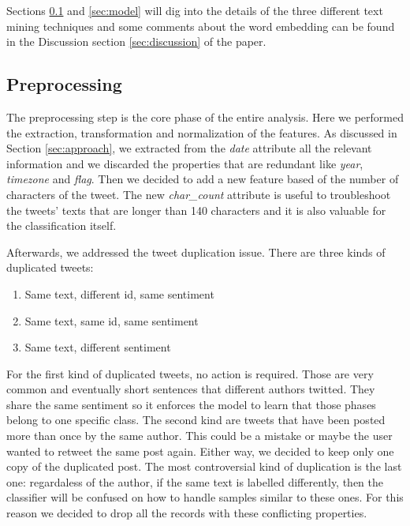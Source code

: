 \documentclass[conference]{IEEEtran}
\begin{document}
Sections \ref{sec:preprocessing} and \ref{sec:model} will dig into the details of the three different text mining techniques and some comments about the word embedding can be found in the Discussion section \ref{sec:discussion} of the paper.

\subsection{Preprocessing}\label{sec:preprocessing}
The preprocessing step is the core phase of the entire analysis. Here we performed the extraction, transformation and normalization of the features. As discussed in Section \ref{sec:approach}, we extracted from the \textit{date} attribute all the relevant information and we discarded the properties that are redundant like \textit{year}, \textit{timezone} and \textit{flag}. Then we decided to add a new feature based of the number of characters of the tweet. The new \textit{char\_count} attribute is useful to troubleshoot the tweets' texts that are longer than 140 characters and it is also valuable for the classification itself.

Afterwards, we addressed the tweet duplication issue. There are three kinds of duplicated tweets:
\begin{enumerate}
    \item Same text, different id, same sentiment
    \item Same text, same id, same sentiment
    \item Same text, different sentiment
\end{enumerate}
For the first kind of duplicated tweets, no action is required. Those are very common and eventually short sentences that different authors twitted. They share the same sentiment so it enforces the model to learn that those phases belong to one specific class. The second kind are tweets that have been posted more than once by the same author. This could be a mistake or maybe the user wanted to retweet the same post again. Either way, we decided to keep only one copy of the duplicated post. The most controversial kind of duplication is the last one: regardaless of the author, if the same text is labelled differently, then the classifier will be confused on how to handle samples similar to these ones. For this reason we decided to drop all the records with these conflicting properties.
\end{document}
